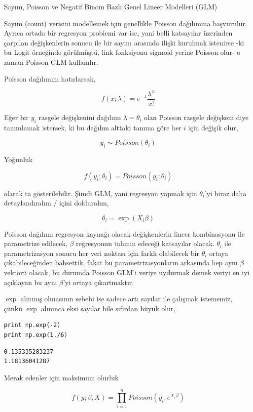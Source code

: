 \documentclass[12pt,fleqn]{article}\usepackage{../../common}
\begin{document}
Sayım, Poisson ve Negatif Binom Bazlı Genel Lineer Modelleri (GLM)

Sayım (count) verisini modellemek için genellikle Poisson dağılımına
başvurulur. Ayrıca ortada bir regresyon problemi var ise, yani belli
katsayılar üzerinden çarpılan değişkenlerin sonucu ile bir sayım arasında
ilişki kurulmak istenirse -ki bu Logit örneğinde görülmüştü, link
fonksiyonu sigmoid yerine Poisson olur- o zaman Poisson GLM kullanılır.

Poisson dağılımını hatırlarsak, 

$$ f(x;\lambda) = e^{-\lambda}\frac{\lambda^{x}}{x!} $$

Eğer bir $y_i$ rasgele değişkenini dağılımı $\lambda=\theta_i$ olan Poisson
rasgele değişkeni diye tanımlamak istersek, ki bu dağılım alttaki tanıma
göre her $i$ için değişik olur,

$$ y_i \sim Poisson(\theta_i) $$

Yoğunluk 

$$ f(y_i;\theta_i) = Poisson(y_i;\theta_i) $$

olarak ta gösterilebilir.  Şimdi GLM, yani regresyon yapmak için
$\theta_i$'yi biraz daha detaylandıralım / içini dolduralım,

$$ \theta_i = \exp(X_i \beta)$$

Poisson dağılımı regresyon kaynağı olacak değişkenlerin lineer kombinasyonu
ile parametrize edilecek, $\beta$ regresyonun tahmin edeceği katsayılar
olacak.  $\theta_i$ ile parametrizasyon sonucu her veri noktası için farklı
olabilecek bir $\theta_i$ ortaya çıkabileceğinden bahsettik, fakat bu
parametrizasyonların arkasında hep aynı $\beta$ vektörü olacak, bu durumda
Poisson GLM'i veriye uydurmak demek veriyi en iyi açıklayan bu aynı
$\beta$'yi ortaya çıkartmaktır.

$\exp$ alınmış olmasının sebebi ise sadece artı sayılar ile çalışmak
istememiz, çünkü $\exp$ alınınca eksi sayılar bile sıfırdan büyük olur,

\begin{verbatim}
print np.exp(-2)
print np.exp(1./6)
\end{verbatim}

\begin{verbatim}
0.135335283237
1.18136041287
\end{verbatim}

Merak edenler için maksimum olurluk

$$ f(y;\beta,X) = \prod_{i=1}^n Poisson(y_i;e^{X_i\beta} ) $$
\end{document}
